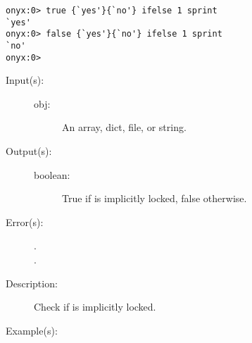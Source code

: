\begin{description}
\begin{description}
\begin{verbatim}
onyx:0> true {`yes'}{`no'} ifelse 1 sprint
`yes'
onyx:0> false {`yes'}{`no'} ifelse 1 sprint
`no'
onyx:0>
		\end{verbatim}
	\end{description}
\label{systemdict:ilocked}
\item[{\onyxop{obj}{ilocked}{boolean}}: ]
	\begin{description}\item[]
	\item[Input(s): ]
		\begin{description}\item[]
		\item[obj: ]
			An array, dict, file, or string.
		\end{description}
	\item[Output(s): ]
		\begin{description}\item[]
		\item[boolean: ]
			True if  is implicitly locked, false
			otherwise.
		\end{description}
	\item[Error(s): ]
		\begin{description}\item[]
		\item[.]
		\item[.]
		\end{description}
	\item[Description: ]
		Check if  is implicitly locked.
	\item[Example(s): ]\begin{verbatim}


\end{verbatim}
\end{description}
\end{description}
